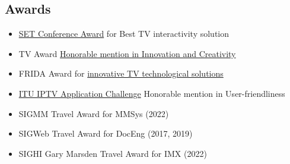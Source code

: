 \documentclass[10pt,a4paper,sans,colorlinks]{moderncv}
\begin{document}
  \subsection{Awards}
    \begin{itemize}[mynosep]
      \item \href{http://set.org.br/artigos/ed137/137_revistadaset_70.pdf}{SET Conference Award} for Best TV interactivity solution
      \item  TV Award \href{https://www.premiotv.com/es/ganadores-es/ganadores-2013-es}{Honorable mention in Innovation and Creativity}
      \item  FRIDA Award for \href{https://programafrida.net/archivos/project/brasil-4d}{innovative TV technological solutions}
    \end{itemize}
    \begin{itemize}[mynosep]
      \item \href{https://itu.int/en/ITU-T/challenges/pages/iptv.aspx}{ITU IPTV Application Challenge} Honorable mention in User-friendliness
    \end{itemize}
    \begin{itemize}[mynosep]
      \item SIGMM Travel Award for MMSys (2022)
      \item SIGWeb Travel Award for DocEng (2017, 2019)
      \item SIGHI Gary Marsden Travel Award for IMX (2022)
    \end{itemize}
\end{document}
